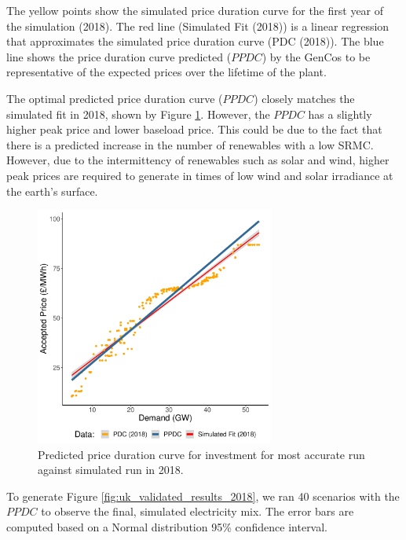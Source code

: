 The yellow points show the simulated price duration curve for the first year of the simulation (2018). The red line (Simulated Fit (2018)) is a linear regression that approximates the simulated price duration curve (PDC (2018)). The blue line shows the price duration curve predicted ($PPDC$) by the GenCos to be representative of the expected prices over the lifetime of the plant.


The optimal predicted price duration curve ($PPDC$) closely matches the simulated fit in 2018, shown by Figure \ref{fig:best_price_curve}. However, the $PPDC$ has a slightly higher peak price and lower baseload price. This could be due to the fact that there is a predicted increase in the number of renewables with a low SRMC. However, due to the intermittency of renewables such as solar and wind, higher peak prices are required to generate in times of low wind and solar irradiance at the earth's surface.



\begin{figure}
	\centering
	\includegraphics[width=0.7\textwidth]{Chapter4/figures/e-Energy-2020/results/best_run_price_dur_curve.pdf}
	\caption{Predicted price duration curve for investment for most accurate run against simulated run in 2018.}
	\label{fig:best_price_curve}
\end{figure}



To generate Figure \ref{fig:uk_validated_results_2018}, we ran 40 scenarios with the $PPDC$ to observe the final, simulated electricity mix. The error bars are computed based on a Normal distribution 95\% confidence interval.

